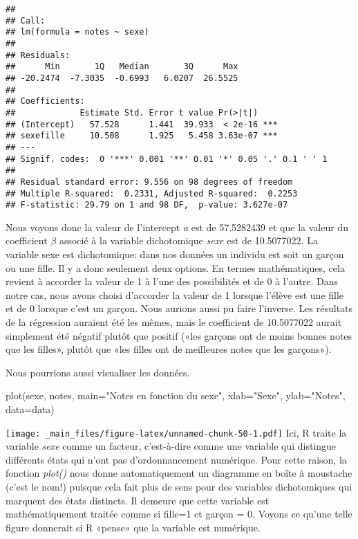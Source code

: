 \documentclass[
]{book}
\newenvironment{Shaded}{\begin{snugshade}}{\end{snugshade}}
\newcommand{\AttributeTok}[1]{\textcolor[rgb]{0.77,0.63,0.00}{#1}}
\newcommand{\FunctionTok}[1]{\textcolor[rgb]{0.00,0.00,0.00}{#1}}
\newcommand{\NormalTok}[1]{#1}
\newcommand{\StringTok}[1]{\textcolor[rgb]{0.31,0.60,0.02}{#1}}
\begin{document}
\begin{verbatim}
## 
## Call:
## lm(formula = notes ~ sexe)
## 
## Residuals:
##      Min       1Q   Median       3Q      Max 
## -20.2474  -7.3035  -0.6993   6.0207  26.5525 
## 
## Coefficients:
##             Estimate Std. Error t value Pr(>|t|)    
## (Intercept)   57.528      1.441  39.933  < 2e-16 ***
## sexefille     10.508      1.925   5.458 3.63e-07 ***
## ---
## Signif. codes:  0 '***' 0.001 '**' 0.01 '*' 0.05 '.' 0.1 ' ' 1
## 
## Residual standard error: 9.556 on 98 degrees of freedom
## Multiple R-squared:  0.2331, Adjusted R-squared:  0.2253 
## F-statistic: 29.79 on 1 and 98 DF,  p-value: 3.627e-07
\end{verbatim}

Nous voyons donc la valeur de l'intercept \emph{a} est de 57.5282439 et que la valeur du coefficient \(\beta\) associé à la variable dichotomique \emph{sexe} est de 10.5077022. La variable sexe est dichotomique: dans nos données un individu est soit un garçon ou une fille. Il y a donc seulement deux options. En termes mathématiques, cela revient à accorder la valeur de 1 à l'une des possibilités et de 0 à l'autre. Dans notre cas, nous avons choisi d'accorder la valeur de 1 lorsque l'élève est une fille et de 0 lorsque c'est un garçon. Nous aurions aussi pu faire l'inverse. Les résultats de la régression auraient été les mêmes, mais le coefficient de 10.5077022 aurait simplement été négatif plutôt que positif («les garçons ont de moins bonnes notes que les filles», plutôt que «les filles ont de meilleures notes que les garçons»).

Nous pourrions aussi visualiser les données.

\begin{Shaded}
\begin{Highlighting}[]
\FunctionTok{plot}\NormalTok{(sexe, notes, }\AttributeTok{main=}\StringTok{"Notes en fonction du sexe"}\NormalTok{, }
    \AttributeTok{xlab=}\StringTok{"Sexe"}\NormalTok{, }\AttributeTok{ylab=}\StringTok{"Notes"}\NormalTok{, }\AttributeTok{data=}\NormalTok{data)}
\end{Highlighting}
\end{Shaded}

\texttt{[image: \_main\_files/figure-latex/unnamed-chunk-50-1.pdf]}
Ici, R traite la variable \emph{sexe} comme un facteur, c'est-à-dire comme une variable qui distingue différents états qui n'ont pas d'ordonnancement numérique. Pour cette raison, la fonction \emph{plot()} nous donne automatiquement un diagramme en boîte à moustache (c'est le nom!) puisque cela fait plus de sens pour des variables dichotomiques qui marquent des états distincts. Il demeure que cette variable est mathématiquement traitée comme si fille=1 et garçon = 0. Voyons ce qu'une telle figure donnerait si R «pense» que la variable est numérique.
\end{document}
